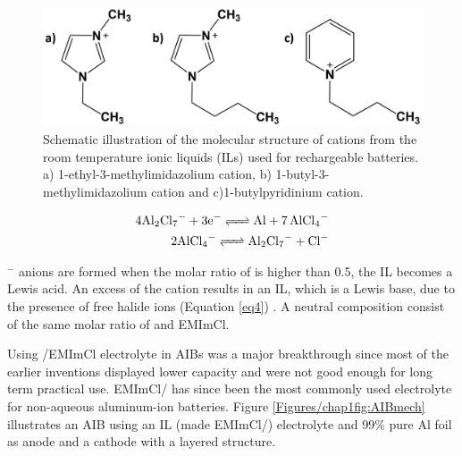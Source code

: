 \begin{figure}[tbh!]
\centering
\includegraphics[width=\textwidth]{Figures/chap1fig/cations}
\caption{Schematic illustration of the molecular structure of cations from the room temperature ionic liquids (ILs) used for rechargeable batteries. a) 1-ethyl-3-methylimidazolium cation, b) 1-butyl-3-methylimidazolium cation and c)1-butylpyridinium cation.}
\label{Figures/chap1fig:cations}
\end{figure}

\begin{align} \label{eq3}
   4\ce{Al2Cl7^{-}} + 3\ce{e- <=> Al + 7AlCl4^{-}} \\
\label{eq4}
   2\ce{AlCl4^{-} <=> Al2Cl7^{-} + Cl-}  
\end{align}

$^-$ anions are formed when the molar ratio of  is higher than 0.5, the IL becomes a Lewis acid. An excess of the cation results in an IL, which is a Lewis base, due to the presence of free halide ions (Equation \ref{eq4}) \cite{holbrey_ionic_1999}. A neutral composition consist of the same molar ratio of  and EMImCl. 

Using /EMImCl electrolyte in AIBs was a major breakthrough since most of the earlier inventions displayed lower capacity and were not good enough for long term practical use. EMImCl/  has since been the most commonly used electrolyte for non-aqueous aluminum-ion batteries.
Figure \ref{Figures/chap1fig:AIBmech} illustrates an AIB using an IL  (made EMImCl/) electrolyte and 99\% pure Al foil as anode and a cathode with a layered structure. 

